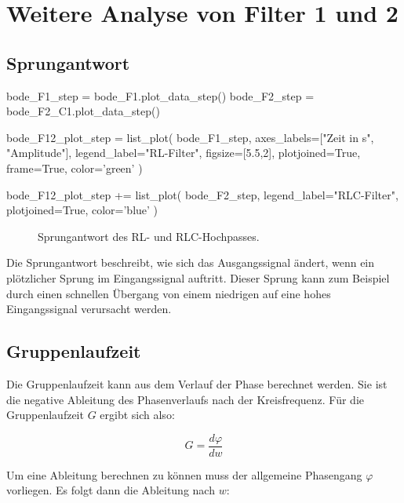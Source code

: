\section{Weitere Analyse von Filter 1 und 2}

\subsection{Sprungantwort}

\begin{sagesilent}
    bode_F1_step = bode_F1.plot_data_step()
    bode_F2_step = bode_F2_C1.plot_data_step()
    
    bode_F12_plot_step = list_plot(
        bode_F1_step,
        axes_labels=["Zeit in s", "Amplitude"],
        legend_label="RL-Filter",
        figsize=[5.5,2],
        plotjoined=True,
        frame=True,
        color='green'
    )

    bode_F12_plot_step += list_plot(
        bode_F2_step,
        legend_label="RLC-Filter",
        plotjoined=True,
        color='blue'
    )
\end{sagesilent}

\begin{figure}[H]
    \centering
    \caption{Sprungantwort des RL- und RLC-Hochpasses.}
    \label{fig:F12_Step}
\end{figure}

Die Sprungantwort beschreibt, wie sich das Ausgangssignal ändert, wenn ein plötzlicher Sprung im Eingangssignal auftritt.
Dieser Sprung kann zum Beispiel durch einen schnellen Übergang von einem niedrigen auf eine hohes Eingangssignal verursacht werden.

\subsection{Gruppenlaufzeit}

Die Gruppenlaufzeit kann aus dem Verlauf der Phase berechnet werden. Sie ist die negative Ableitung des Phasenverlaufs nach der Kreisfrequenz. Für die Gruppenlaufzeit $G$ ergibt sich also:

\begin{equation*}
    G = \frac{d \varphi}{d w}
\end{equation*}

Um eine Ableitung berechnen zu können muss der allgemeine Phasengang $\varphi$ vorliegen. Es folgt dann die Ableitung nach $w$:

\vspace{1em}

